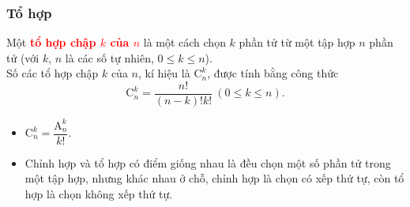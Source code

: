 \subsubsection{Tổ hợp}
\begin{khung4}{}
	Một \textbf{\textcolor{red}{tổ hợp chập $k$ của $n$}} là một cách chọn $k$ phần tử từ một tập hợp $n$ phần tử (với $k$, $n$ là các số tự nhiên, $0 \le k \le n$).
	\\
	Số các tổ hợp chập $k$ của $n$, kí hiệu là $\mathrm{C}_n^k$, được tính bằng công thức
	$$\mathrm{C}_n^k = \dfrac{n!}{(n-k)!k!} \ (0 \le k \le n).$$
\end{khung4}
\begin{note}
	\begin{itemize}
		\item $\mathrm{C}_n^k = \dfrac{\mathrm{A}_n^k}{k!}$.
		\item Chỉnh hợp và tổ hợp có điểm giống nhau là đều chọn một số phần tử trong một tập hợp, nhưng khác nhau ở chỗ, chỉnh hợp là chọn có xếp thứ tự, còn tổ hợp là chọn không xếp thứ tự.
	\end{itemize}
\end{note}
